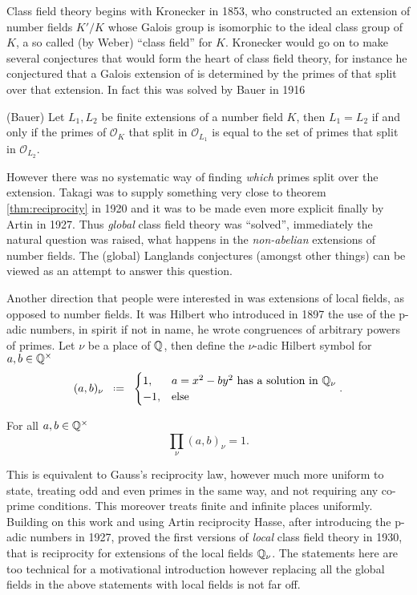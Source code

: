 Class field theory begins with Kronecker in 1853, who constructed an extension of number fields \(K'/K\) whose Galois group is isomorphic to the ideal class group of \(K\), a so called (by Weber) ``class field'' for \(K\). Kronecker would go on to make several conjectures that would form the heart of class field theory, for instance he conjectured that a Galois extension of \Q is determined by the primes of \Z that split over that extension. In fact this was solved by Bauer in 1916
\begin{Theorem}(Bauer)
	Let \(L_1, L_2\) be finite extensions of a number field \(K\), then \(L_1 = L_2\) if and only if the primes of \(\mathcal{O}_K\) that split in \(\mathcal{O}_{L_1}\) is equal to the set of primes that split in \(\mathcal{O}_{L_2}\).
\end{Theorem}
However there was no systematic way of finding \textit{which} primes split over the extension. Takagi was to supply something very close to theorem \ref{thm:reciprocity} in 1920 and it was to be made even more explicit finally by Artin in 1927. Thus \textit{global} class field theory was ``solved'', immediately the natural question was raised, what happens in the \textit{non-abelian} extensions of number fields. The (global) Langlands conjectures (amongst other things) can be viewed as an attempt to answer this question. 

Another direction that people were interested in was extensions of local fields, as opposed to number fields. It was Hilbert who introduced in 1897 the use of the p-adic numbers, in spirit if not in name, he wrote congruences of arbitrary powers of primes. Let \(\nu\) be a place of \(\Q\), then define the \(\nu\)-adic Hilbert symbol for \(a,b\in \Q^\times\)
\[(a,b)_\nu \defeq \begin{cases}
	1, & a= x^2-by^2 \text{ has a solution in }\Q_\nu\\
	-1, &\text{else}
\end{cases} .\]
\begin{Theorem}
	For all \(	a,b\in \Q^\times\) 
	\[\prod_\nu (a,b)_\nu = 1.\]
\end{Theorem}
This is equivalent to Gauss's reciprocity law, however much more uniform to state, treating odd and even primes in the same way, and not requiring any co-prime conditions. This moreover treats finite and infinite places uniformly. Building on this work and using Artin reciprocity Hasse, after introducing the p-adic numbers in 1927, proved the first versions of \textit{local} class field theory in 1930, that is reciprocity for extensions of the local fields \(\Q_\nu\). The statements here are too technical for a motivational introduction however replacing all the global fields in the above statements with local fields is not far off. 

